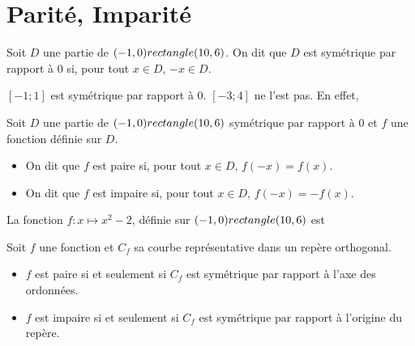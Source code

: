 \section{Parité, Imparité}

\begin{Définition*}
Soit $D$ une partie de $(-1,0) rectangle (10,6)$. On dit que $D$ est symétrique par rapport à $0$ si, pour tout $x \in D$, $-x \in D$.
\end{Définition*}

\begin{Exemple}
$[-1; 1]$ est symétrique par rapport à $0$. $[-3; 4]$ ne l'est pas. En effet, \ligne

\end{Exemple}

\begin{Définition}
Soit $D$ une partie de $(-1,0) rectangle (10,6)$ symétrique par rapport à $0$ et $f$ une fonction définie sur $D$.
\begin{itemize}[label=\textcolor{Couleur6}{$\bullet$}]
    \item On dit que $f$ est paire si, pour tout $x \in D$, $f(-x) = f(x)$.
    \item On dit que $f$ est impaire si, pour tout $x \in D$, $f(-x) = -f(x)$.
\end{itemize}
\end{Définition}

\begin{Exemple}
La fonction $f : x \mapsto x^2 - 2$, définie sur $(-1,0) rectangle (10,6)$ est \pointille{2cm} \\

\ligne

\end{Exemple}

\newpage

\begin{Propriété}
Soit $f$ une fonction et $C_f$ sa courbe représentative dans un repère orthogonal.
\begin{itemize}[label=\textcolor{Couleur2}{$\bullet$}]
    \item $f$ est paire si et seulement si $C_f$ est symétrique par rapport à l'axe des ordonnées.
    \item $f$ est impaire si et seulement si $C_f$ est symétrique par rapport à l'origine du repère.
\end{itemize}
\end{Propriété}

